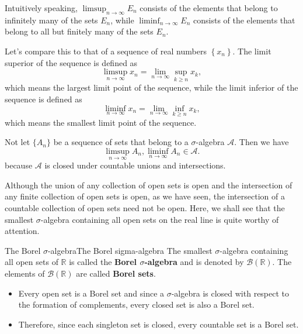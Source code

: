 \documentclass[../main.tex]{subfiles}
\begin{document}
\begin{remark}
	Intuitively speaking, $\limsup_{n \to \infty} E_n$ consists of the elements that belong to infinitely many of the sets $E_n$, while $\liminf_{n \to \infty} E_n$ consists of the elements that belong to all but finitely many of the sets $E_n$.

	Let's compare this to that of a sequence of real numbers $\left\{ x_n \right\}$. The limit superior of the sequence is defined as
	\begin{equation*}
		\limsup_{n \to \infty} x_n = \lim_{n \to \infty} \sup_{k \geq n} x_k,
	\end{equation*}
	which means the largest limit point of the sequence, while the limit inferior of the sequence is defined as
	\begin{equation*}
		\liminf_{n \to \infty} x_n = \lim_{n \to \infty} \inf_{k \geq n} x_k,
	\end{equation*}
	which means the smallest limit point of the sequence.
\end{remark}

Not let $\{A_n\}$ be a sequence of sets that belong to a $\sigma$-algebra $\mathcal{A}$. Then we have
\begin{equation}
	\limsup_{n \to \infty} A_n, \liminf_{n \to \infty} A_n \in \mathcal{A}.
\end{equation}
because $\mathcal{A}$ is closed under countable unions and intersections.

Although the union of any collection of open sets is open and the intersection of any finite collection of open sets is open, as we have seen, the intersection of a countable collection of open sets need not be open. Here, we shall see that the smallest $\sigma$-algebra containing all open sets on the real line is quite worthy of attention.
\begin{definition}{The Borel $\sigma$-algebra}{The Borel sigma-algebra}
	The smallest $\sigma$-algebra containing all open sets of $\mathbb{R}$ is called the \textbf{Borel $\sigma$-algebra} and is denoted by $\mathcal{B}(\mathbb{R})$. The elements of $\mathcal{B}(\mathbb{R})$ are called \textbf{Borel sets}.
\end{definition}

\begin{itemize}
	\item Every open set is a Borel set and since a $\sigma$-algebra is closed with respect to the formation of complements, every closed set is also a Borel set.
	\item Therefore, since each singleton set is closed, every countable set is a Borel set.
\end{itemize}
\end{document}
